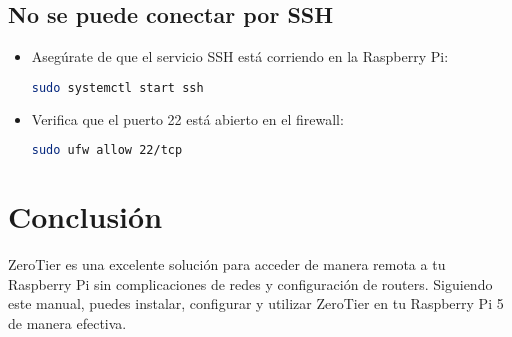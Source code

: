\subsection{No se puede conectar por SSH}
\begin{itemize}
    \item Asegúrate de que el servicio SSH está corriendo en la Raspberry Pi:
    \begin{lstlisting}[language=bash]
sudo systemctl start ssh
    \end{lstlisting}
    
    \item Verifica que el puerto 22 está abierto en el firewall:
    \begin{lstlisting}[language=bash]
sudo ufw allow 22/tcp
    \end{lstlisting}
\end{itemize}


\section{Conclusión}
ZeroTier es una excelente solución para acceder de manera remota a tu Raspberry Pi sin complicaciones de redes y configuración de routers. Siguiendo este manual, puedes instalar, configurar y utilizar ZeroTier en tu Raspberry Pi 5 de manera efectiva.
